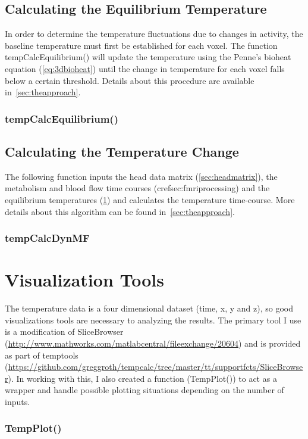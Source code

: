 \section{Calculating the Equilibrium Temperature}
\label{sec:findequil}
In order to determine the temperature fluctuations due to changes in activity, the baseline temperature must first be established for each voxel.  The function tempCalcEquilibrium() will update the temperature using the Penne's bioheat equation (\cref{eq:3dbioheat}) until the change in temperature for each voxel falls below a certain threshold.  Details about this procedure are available in~\cref{sec:theapproach}.
\subsection{tempCalcEquilibrium()}

\clearpage
\section{Calculating the Temperature Change}
The following function inputs the head data matrix (\cref{sec:headmatrix}), the metabolism and blood flow time courses (cref{sec:fmriprocessing}) and the equilibrium temperatures (\cref{sec:findequil}) and calculates the temperature time-course.   More details about this algorithm can be found in~\cref{sec:theapproach}.
\subsection{tempCalcDynMF}

\chapter{Visualization Tools}
\label{ch:visualize}
The temperature data is a four dimensional dataset (time, x, y and z), so good visualizations tools are necessary to analyzing the results.  The primary tool I use is a modification of SliceBrowser (\url{http://www.mathworks.com/matlabcentral/fileexchange/20604}) and is provided as part of temptools (\url{https://github.com/greggroth/tempcalc/tree/master/tt/supportfcts/SliceBrowser}).  In working with this, I also created a function (TempPlot()) to act as a wrapper and handle possible plotting situations depending on the number of inputs.
\subsection{TempPlot()}

